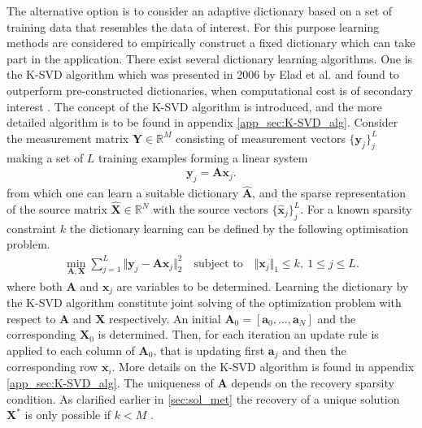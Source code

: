 The alternative option is to consider an adaptive dictionary based on a set of training data that resembles the data of interest. 
For this purpose learning methods are considered to empirically construct a fixed dictionary which can take part in the application. 
There exist several dictionary learning algorithms. One is the K-SVD algorithm which was presented in 2006 by Elad et al. and found to outperform pre-constructed dictionaries, when computational cost is of secondary interest \cite{Elad2006}. The concept of the K-SVD algorithm is introduced, and the more detailed algorithm is to be found in appendix \ref{app_sec:K-SVD_alg}. 
Consider the measurement matrix $\mathbf{Y} \in \mathbb{R}^M$ consisting of measurement vectors $\lbrace \mathbf{y}_j \rbrace_j^L$ making a set of $L$ training examples forming a linear system
\begin{align*}
\mathbf{y}_j = \mathbf{A} \mathbf{x}_j.
\end{align*}
from which one can learn a suitable dictionary $\hat{\mathbf{A}}$, and the sparse representation of the source matrix $\hat{\mathbf{X}} \in \mathbb{R}^N$ with the source vectors $\lbrace \hat{\mathbf{x}}_j \rbrace_j^L$.
For a known sparsity constraint $k$ the dictionary learning can be defined by the following optimisation problem. 
\begin{align}\label{eq:SVD1}
\min_{\mathbf{A}, \mathbf{X}} \sum_{j=1}^{L} \Vert \mathbf{y}_j - \mathbf{A} \mathbf{x}_j \Vert_2^2 \quad \text{subject to} \quad \Vert \textbf{x}_j \Vert_1 \leq k, \ 1 \leq j \leq L.
\end{align}
where both $\textbf{A}$ and $\textbf{x}_j$ are variables to be determined.
Learning the dictionary by the K-SVD algorithm constitute joint solving of the optimization problem with respect to $\mathbf{A}$ and $\mathbf{X}$ respectively. An initial $\textbf{A}_0 = [\textbf{a}_0,\hdots,\textbf{a}_N]$ and the corresponding $\textbf{X}_0$ is determined. Then, for each iteration an update rule is applied to each column of $\textbf{A}_0$, that is updating first $\textbf{a}_j$ and then the corresponding row $\textbf{x}_i$. More details on the K-SVD algorithm is found in appendix \ref{app_sec:K-SVD_alg}. 
The uniqueness of $\mathbf{A}$ depends on the recovery sparsity condition. As clarified earlier in \ref{sec:sol_met} the recovery of a unique solution $\mathbf{X}^\ast$ is only possible if $k < M$ \cite{phd2015}.


